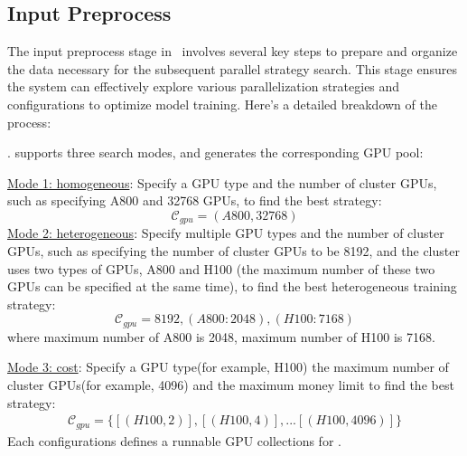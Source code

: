 \subsection{Input Preprocess}\label{sec:scheme:input}

The input preprocess stage in \sysname\ involves several key steps to prepare and organize the data necessary for the subsequent parallel strategy search. This stage ensures the system can effectively explore various parallelization strategies and configurations to optimize model training. Here’s a detailed breakdown of the process:

. 
\sysname supports three search modes, and generates the corresponding GPU pool:

\underline{Mode 1: homogeneous}: Specify a GPU type and the number of cluster GPUs, such as specifying A800 and 32768 GPUs, to find the best strategy:
\begin{equation}
    \mathcal{C}_{gpu}=(A800, 32768)
\end{equation}
\underline{Mode 2: heterogeneous}: Specify multiple GPU types and the number of cluster GPUs, such as specifying the number of cluster GPUs to be 8192, and the cluster uses two types of GPUs, A800 and H100 (the maximum number of these two GPUs can be specified at the same time), to find the best heterogeneous training strategy:
\begin{equation}
    \mathcal{C}_{gpu}=8192, (A800:2048),(H100:7168)
\end{equation}
where maximum number of A800 is 2048, maximum number of H100 is 7168.

\underline{Mode 3: cost}: Specify a GPU type(for example, H100) the maximum number of cluster GPUs(for example, 4096) and the maximum money limit to find the best strategy:
\begin{align}
\mathcal{C}_{gpu}=\{
[(H100, 2)], [(H100, 4)], ... [(H100, 4096)]\}
\end{align}
Each configurations defines a runnable GPU collections for \sysname.

